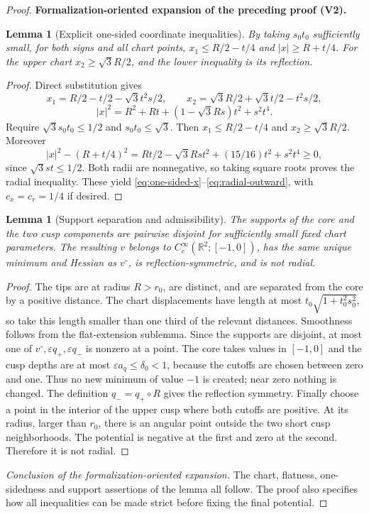 \documentclass[11pt]{article}
\newtheorem{lemma}[theorem]{Lemma}
\newcommand{\formalisationparentid}{X}
\newenvironment{formalisationaddition}[1]{\par\medskip\begingroup\color{blue}\def\formalisationparentid{#1}\setcounter{formalizationsublemma}{0}\let\lemma\formalizationsublemma\let\endlemma\endformalizationsublemma
  \def\Eo{\mathcal E_h^\circ}\def\EE{\mathcal E_h}\def\phio{\phi_h^\circ}\def\phih{\phi_h}\def\Ho{H_h^{\rm atom}(v^\circ)}\def\Ha{H_h^{\rm atom}}\def\HL{H_h^{L}}\def\Dh{D_h}\def\Log{\operatorname{Log}}\def\ellh{\ell_h}\def\Gp{G_{p,h}}\def\Ast{A_{*,h}}\def\ahat{\widehat{\mathfrak a}_h}\def\ah{\mathfrak a_h}\def\rh{\widehat\rho_h}\def\deltah{\widehat\delta_h}\def\oldref##1{\textup{(##1)}}\def\interface##1{\par\noindent\textit{Analytical interface used here.} ##1\par}\def\finish{\par\noindent\textit{Conclusion of the formalization-oriented expansion.} }\par\noindent\textbf{Formalization-oriented expansion of the preceding proof (V2).}\par\smallskip
}{\par\endgroup\medskip
}
\newcommand{\R}{\mathbb R}
\newcommand{\eps}{\varepsilon}
\begin{document}
\begin{proof}
\begin{formalisationaddition}{L2.9}
\begin{lemma}[Explicit one-sided coordinate inequalities]\label{sublemma:L2-9-coordinate-inequalities}
By taking $s_0t_0$ sufficiently small, for both signs and all chart points,
$x_1\le R/2-t/4$ and $|x|\ge R+t/4$. For the upper chart $x_2\ge\sqrt3R/2$, and the lower inequality is its reflection.
\end{lemma}
\begin{proof}
Direct substitution gives
\[
 x_1=R/2-t/2-\sqrt3t^2s/2,\qquad
 x_2=\sqrt3R/2+\sqrt3t/2-t^2s/2,
\]
\[
 |x|^2=R^2+Rt+(1-\sqrt3Rs)t^2+s^2t^4.
\]
Require $\sqrt3s_0t_0\le1/2$ and $s_0t_0\le\sqrt3$.
Then $x_1\le R/2-t/4$ and $x_2\ge\sqrt3R/2$.
Moreover
\[
 |x|^2-(R+t/4)^2
 =Rt/2-\sqrt3Rs t^2+(15/16)t^2+s^2t^4\ge0,
\]
since $\sqrt3s t\le1/2$. Both radii are nonnegative, so taking square roots proves the radial inequality. These yield \eqref{eq:one-sided-x}--\eqref{eq:radial-outward}, with $c_x=c_r=1/4$ if desired.
\end{proof}

\begin{lemma}[Support separation and admissibility]\label{sublemma:L2-9-potential}
The supports of the core and the two cusp components are pairwise disjoint for sufficiently small fixed chart parameters. The resulting $v$ belongs to $C_c^\infty(\R^2;[-1,0])$, has the same unique minimum and Hessian as $v^\circ$, is reflection-symmetric, and is not radial.
\end{lemma}
\begin{proof}
The tips are at radius $R>r_0$, are distinct, and are separated from the core by a positive distance. The chart displacements have length at most $t_0\sqrt{1+t_0^2s_0^2}$, so take this length smaller than one third of the relevant distances. Smoothness follows from the flat-extension sublemma. Since the supports are disjoint, at most one of $v^\circ,\eps q_+,\eps q_-$ is nonzero at a point. The core takes values in $[-1,0]$ and the cusp depths are at most $\eps a_q\le\delta_0<1$, because the cutoffs are chosen between zero and one. Thus no new minimum of value $-1$ is created; near zero nothing is changed. The definition $q_-=q_+\circ R$ gives the reflection symmetry.
Finally choose a point in the interior of the upper cusp where both cutoffs are positive. At its radius, larger than $r_0$, there is an angular point outside the two short cusp neighborhoods. The potential is negative at the first and zero at the second. Therefore it is not radial.
\end{proof}
\finish The chart, flatness, one-sidedness and support assertions of the lemma all follow. The proof also specifies how all inequalities can be made strict before fixing the final potential.
\end{formalisationaddition}

\end{proof}
\end{document}

